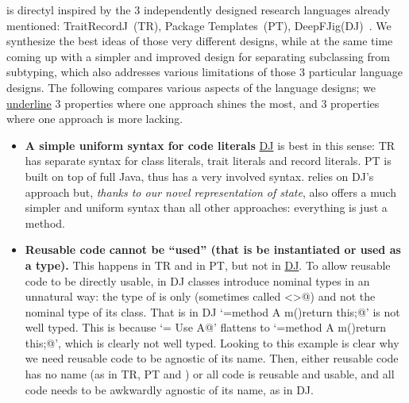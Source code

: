 \name is directyl inspired by the 3 independently designed research languages already mentioned:
 TraitRecordJ~(TR)\cite{Bettini:2010:ISP:1774088.1774530}, Package Templates~(PT)\cite{KrogdahlMS09}, DeepFJig(DJ)~\cite{deep}.
We synthesize
the best ideas of those very different designs, while at the same time 
coming up with a simpler and improved design for separating
subclassing from subtyping, which also addresses various limitations of those
3 particular language designs.
The following compares 
various aspects of the language designs;
we \underline{underline} 3 properties where one approach shines the most, and 3 properties where one approach is more lacking.
\begin{itemize}
\item {\bf A simple uniform syntax for code literals}
\underline{DJ} is best in this sense: TR has separate syntax for class literals, trait literals and record literals.
PT is built on top of full Java, thus has a very
involved syntax.
\name relies on DJ's approach but,
\emph{thanks to our novel representation of state}, \name also offers a much simpler and uniform syntax than
all other approaches: everything is just a method.
\item 
{\bf Reusable code cannot be ``used'' (that is be instantiated or used as a type).}
This happens in TR and in PT, but not in \underline{DJ}. To allow reusable code to be directly 
usable, in DJ
classes introduce nominal types in an unnatural way: the type of
\Q@this@ is only \Q@This@ (sometimes called \Q@<>@) and not the
nominal type of its class. 
That is in DJ 
`\Q@A={method A m(){return this;}}@' is not well typed. This is because
`\Q@B= Use A@' flattens to `\Q@B={method A m(){return this;}}@', which is clearly not well typed.
Looking to this example is clear why we need reusable code to be agnostic of its name.
Then, either reusable code has no name (as in TR, PT and \name)
or all code is reusable and usable, and all code needs to be awkwardly agnostic of its name, as in DJ.


\end{itemize}

